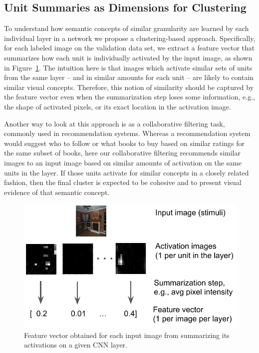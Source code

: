\subsection{Unit Summaries as Dimensions for Clustering}
\label{ss:approach_feature_vectors}

To understand how semantic concepts of similar granularity are learned by each individual layer in a network we propose a clustering-based approach.  Specifically, for each labeled image on the validation data set, we extract a feature vector that summarizes how each unit is individually activated by the input image, as shown in Figure~\ref{fig:vectorization}.  The intuition here is that images which activate similar sets of units from the same layer -- and in similar amounts for each unit -- are likely to contain similar visual concepts.  Therefore, this notion of similarity should be captured by the  feature vector even when the summarization step loses some information, e.g., the shape of activated pixels, or its exact location in the activation image.

Another way to look at this approach is as a collaborative filtering task, commonly used in recommendation systems.  Whereas a recommendation system would suggest who to follow or what books to buy based on similar ratings for the same subset of books, here our collaborative filtering recommends similar images to an input image based on similar amounts of activation on the same units in the layer.  If those units activate for similar concepts in a closely related fashion, then the final cluster is expected to be cohesive and to present visual evidence of that semantic concept.

\begin{figure}[t]
\centering
\includegraphics[width=\columnwidth]{figures/vectorization}
\caption{Feature vector obtained for each input image from summarizing its activations on a given CNN layer.}
\label{fig:vectorization}
\end{figure}